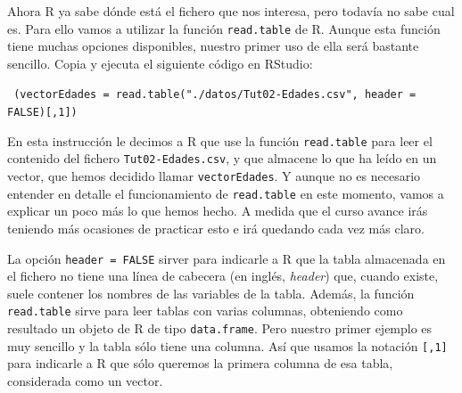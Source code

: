 \documentclass[10pt,a4paper]{article}\usepackage[]{graphicx}\usepackage[]{color}
\newcounter {cont01}
\begin{document}
%

Ahora R ya sabe dónde está el fichero que nos interesa, pero todavía no sabe cual es. Para ello vamos a utilizar la función {\tt read.table} de R. Aunque esta función tiene muchas opciones disponibles, nuestro primer uso de ella será bastante sencillo. Copia y ejecuta el siguiente código en RStudio:
\begin{center}
\begin{minipage}{10cm}
{\tt
(vectorEdades = read.table("./datos/Tut02-Edades.csv", header = FALSE)[,1])
}
\end{minipage}
\end{center}
En esta instrucción le decimos a R que use la función {\tt read.table} para leer el contenido del fichero {\tt Tut02-Edades.csv}, y que almacene lo que ha leído en un vector, que hemos decidido llamar {\tt vectorEdades}. Y aunque no es necesario entender en detalle el funcionamiento de {\tt read.table} en este momento, vamos a explicar un poco más lo que hemos hecho. A medida que el curso avance irás teniendo más ocasiones de practicar esto e irá quedando cada vez más claro. 

La opción {\tt header = FALSE} sirver para indicarle a R que la tabla almacenada en el fichero no tiene una línea de cabecera (en inglés, {\em header}) que, cuando existe, suele contener los nombres de las variables de la tabla. Además, la función {\tt read.table} sirve para leer tablas con varias columnas, obteniendo como resultado un objeto de R de tipo {\tt data.frame}. Pero nuestro primer ejemplo es muy sencillo y la tabla sólo tiene una columna. Así que usamos la notación {\tt [,1]} para indicarle a R que sólo queremos la primera columna de esa tabla, considerada como un vector.
\end{document}
